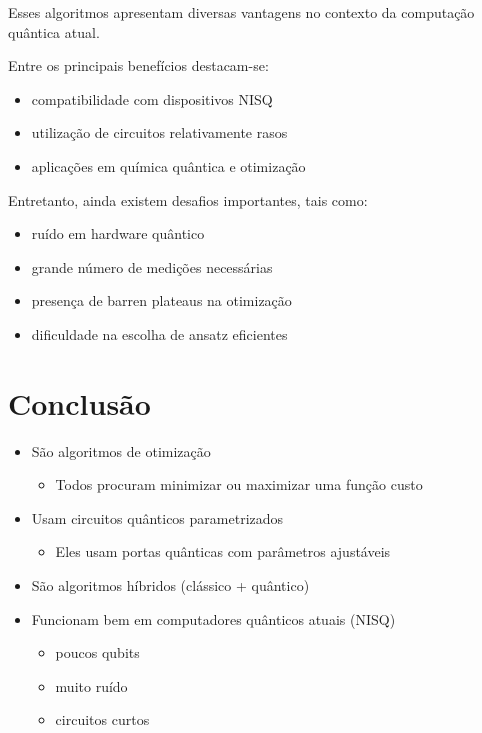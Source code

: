 \documentclass[a4paper,12pt]{article}
\begin{document}
Esses algoritmos apresentam diversas vantagens no contexto da computação quântica atual.

Entre os principais benefícios destacam-se:

\begin{itemize}
\item compatibilidade com dispositivos NISQ
\item utilização de circuitos relativamente rasos
\item aplicações em química quântica e otimização
\end{itemize}

Entretanto, ainda existem desafios importantes, tais como:

\begin{itemize}
\item ruído em hardware quântico
\item grande número de medições necessárias
\item presença de barren plateaus na otimização
\item dificuldade na escolha de ansatz eficientes
\end{itemize}

\section{Conclusão}

\begin{tcolorbox}[colback=blue!10,colframe=blue!70!black,title=Algoritmos]
\begin{itemize}

\item São algoritmos de otimização
    \begin{itemize}
        \item Todos procuram minimizar ou maximizar uma função custo
    \end{itemize}

\item Usam circuitos quânticos parametrizados
    \begin{itemize}
        \item Eles usam portas quânticas com parâmetros ajustáveis
    \end{itemize}

\item São algoritmos híbridos (clássico + quântico)

\item Funcionam bem em computadores quânticos atuais (NISQ)
    \begin{itemize}
        \item poucos qubits
        \item muito ruído
        \item circuitos curtos
    \end{itemize}

\end{itemize}
\end{tcolorbox}
\end{document}
